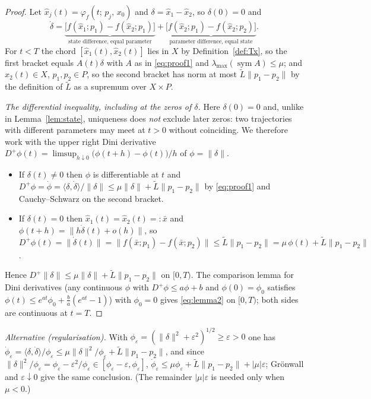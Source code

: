 \documentclass[11pt]{article}
\theoremstyle{remark}\newtheorem{remark}{Remark}
\newcommand{\norm}[1]{\lVert #1\rVert}
\newcommand{\flow}[3]{\varphi_f(#1;\,#2,\,#3)}
\begin{document}
\begin{proof}
Let $\hat x_j(t)=\flow{t}{p_j}{x_0}$ and $\delta=\hat x_1-\hat x_2$, so $\delta(0)=0$ and
\[
\dot\delta=\underbrace{\big[f(\hat x_1;p_1)-f(\hat x_2;p_1)\big]}_{\text{state difference, equal parameter}}
+\underbrace{\big[f(\hat x_2;p_1)-f(\hat x_2;p_2)\big]}_{\text{parameter difference, equal state}} .
\]
For $t<T$ the chord $[\hat x_1(t),\hat x_2(t)]$ lies in $X$ by Definition~\ref{def:Tx}, so the first bracket equals $A(t)\delta$ with $A$ as in \eqref{eq:proof1} and $\lambda_{\max}(\operatorname{sym}A)\le\mu$; and $\hat x_2(t)\in X$, $p_1,p_2\in P$, so the second bracket has norm at most $\tilde L\norm{p_1-p_2}$ by the definition of $\tilde L$ as a supremum over $X\times P$.

\emph{The differential inequality, including at the zeros of $\delta$.} Here $\delta(0)=0$ and, unlike in Lemma~\ref{lem:state}, uniqueness does \emph{not} exclude later zeros: two trajectories with different parameters may meet at $t>0$ without coinciding. We therefore work with the upper right Dini derivative $D^{+}\phi(t)=\limsup_{h\downarrow0}\big(\phi(t+h)-\phi(t)\big)/h$ of $\phi=\norm\delta$.
\begin{itemize}[nosep]
\item If $\delta(t)\ne0$ then $\phi$ is differentiable at $t$ and $D^{+}\phi=\dot\phi=\langle\delta,\dot\delta\rangle/\norm\delta\le\mu\norm\delta+\tilde L\norm{p_1-p_2}$ by \eqref{eq:proof1} and Cauchy--Schwarz on the second bracket.
\item If $\delta(t)=0$ then $\hat x_1(t)=\hat x_2(t)=:\bar x$ and $\phi(t+h)=\norm{h\dot\delta(t)+o(h)}$, so $D^{+}\phi(t)=\norm{\dot\delta(t)}=\norm{f(\bar x;p_1)-f(\bar x;p_2)}\le\tilde L\norm{p_1-p_2}=\mu\,\phi(t)+\tilde L\norm{p_1-p_2}$.
\end{itemize}
Hence $D^{+}\norm\delta\le\mu\norm\delta+\tilde L\norm{p_1-p_2}$ on $[0,T)$. The comparison lemma for Dini derivatives (any continuous $\phi$ with $D^{+}\phi\le a\phi+b$ and $\phi(0)=\phi_0$ satisfies $\phi(t)\le e^{at}\phi_0+\tfrac{b}{a}(e^{at}-1)$) with $\phi_0=0$ gives \eqref{eq:lemma2} on $[0,T)$; both sides are continuous at $t=T$.
\end{proof}
\emph{Alternative (regularisation).} With $\phi_\varepsilon=(\norm\delta^2+\varepsilon^2)^{1/2}\ge\varepsilon>0$ one has $\dot\phi_\varepsilon=\langle\delta,\dot\delta\rangle/\phi_\varepsilon\le\mu\norm\delta^2/\phi_\varepsilon+\tilde L\norm{p_1-p_2}$, and since $\norm\delta^2/\phi_\varepsilon=\phi_\varepsilon-\varepsilon^2/\phi_\varepsilon\in[\phi_\varepsilon-\varepsilon,\phi_\varepsilon]$, $\dot\phi_\varepsilon\le\mu\phi_\varepsilon+\tilde L\norm{p_1-p_2}+|\mu|\varepsilon$; Gr\"onwall and $\varepsilon\downarrow0$ give the same conclusion. (The remainder $|\mu|\varepsilon$ is needed only when $\mu<0$.)
\end{document}
